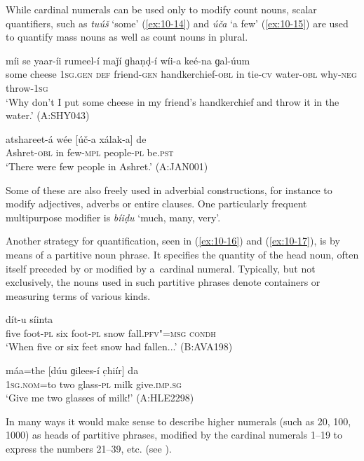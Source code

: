 While cardinal numerals can be used only to modify count nouns, scalar quantifiers, such as \textit{tuúš} `some' (\ref{ex:10-14}) and \textit{úča} `a few' (\ref{ex:10-15}) are used to quantify mass nouns as well as count nouns in plural. 

\begin{exe}
\ex
\label{ex:10-14}
 míi se yaar-íi rumeel-í maǰí ɡhaṇḍ-í wíi-a keé-na ɡal-úum \\
some cheese \textsc{1sg.gen} \textsc{def} friend-\textsc{gen} handkerchief-\textsc{obl}  in tie-\textsc{cv} water-\textsc{obl} why-\textsc{neg} throw-\textsc{1sg} \\
\glt `Why don't I put some cheese in my friend's handkerchief and throw it in the water.' (A:SHY043)

\ex
\label{ex:10-15}
\gll atshareet-á wée [úč-a xálak-a] de \\
Ashret-\textsc{obl} in few-\textsc{mpl} people-\textsc{pl} be.\textsc{pst} \\
\glt `There were few people in Ashret.' (A:JAN001)
\end{exe}

Some of these are also freely used in adverbial constructions, for instance to modify adjectives, adverbs or entire clauses. One particularly frequent multipurpose modifier is \textit{bíiḍu} `much, many, very'.


Another strategy for quantification, seen in (\ref{ex:10-16}) and (\ref{ex:10-17}), is by means of a partitive noun phrase. It specifies the quantity of the head noun, often itself preceded by or modified by a~cardinal numeral. Typically, but not exclusively, the nouns used in such partitive phrases denote containers or measuring terms of various kinds.

\begin{exe}
\ex
\label{ex:10-16}
 dít-u síinta \\
five foot-\textsc{pl} six foot-\textsc{pl} snow fall.\textsc{pfv"=msg} \textsc{condh} \\
\glt `When five or six feet snow had fallen...' (B:AVA198)

\ex
\label{ex:10-17}
\gll máa=the [dúu ɡilees-í c̣hiír] da \\
\textsc{1sg}.\textsc{nom}=to two glass-\textsc{pl} milk give.\textsc{imp.sg} \\
\glt `Give me two glasses of milk!' (A:HLE2298)
\end{exe}

In many ways it would make sense to describe higher numerals (such as 20, 100, 1000) as heads of partitive phrases, modified by the cardinal numerals 1--19 to express the numbers 21--39, etc. (see ).


